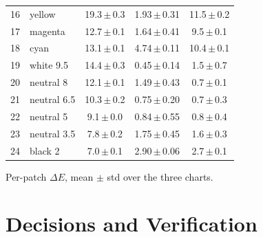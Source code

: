 \documentclass[9pt]{extarticle}
\begin{document}
{\begin{minipage}[t]{0.49\linewidth}
\begin{tabular}{@{}rlccc@{}}
16 & yellow & 19.3\,$\pm$\,0.3 & 1.93\,$\pm$\,0.31 & 11.5\,$\pm$\,0.2 \\
17 & magenta & 12.7\,$\pm$\,0.1 & 1.64\,$\pm$\,0.41 & 9.5\,$\pm$\,0.1 \\
18 & cyan & 13.1\,$\pm$\,0.1 & 4.74\,$\pm$\,0.11 & 10.4\,$\pm$\,0.1 \\
19 & white 9.5 & 14.4\,$\pm$\,0.3 & 0.45\,$\pm$\,0.14 & 1.5\,$\pm$\,0.7 \\
20 & neutral 8 & 12.1\,$\pm$\,0.1 & 1.49\,$\pm$\,0.43 & 0.7\,$\pm$\,0.1 \\
21 & neutral 6.5 & 10.3\,$\pm$\,0.2 & 0.75\,$\pm$\,0.20 & 0.7\,$\pm$\,0.3 \\
22 & neutral 5 & 9.1\,$\pm$\,0.0 & 0.84\,$\pm$\,0.55 & 0.8\,$\pm$\,0.4 \\
23 & neutral 3.5 & 7.8\,$\pm$\,0.2 & 1.75\,$\pm$\,0.45 & 1.6\,$\pm$\,0.3 \\
24 & black 2 & 7.0\,$\pm$\,0.1 & 2.90\,$\pm$\,0.06 & 2.7\,$\pm$\,0.1 \\
\bottomrule\end{tabular}
\end{minipage}\par}
{\footnotesize\centering Per-patch $\Delta E$, mean $\pm$ std over the three charts.\par}


\clearpage
\section*{Decisions and Verification}
\end{document}
